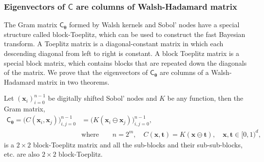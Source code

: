 \documentclass{svjour3}                     %
\newcommand{\bm}[1]{\boldsymbol{#1}}
\newcommand{\vtheta}{{\bm{\theta}}}
\newcommand{\vt}{\bm{t}}
\newcommand{\vx}{\bm{x}}
\newcommand{\mC}{\mathsf{C}}
\newcommand{\mCtheta}{{\mathsf{C}_{\vtheta}}}
\begin{document}
\subsubsection{Eigenvectors of $\mC$ are columns of Walsh-Hadamard matrix}
\label{sec:eigenvector_hadamard}
The Gram matrix $\mCtheta$ formed by Walsh kernels and Sobol' nodes have a special structure called  block-Toeplitz, which can be used to construct the fast Bayesian transform. 
A Toeplitz matrix is a diagonal-constant matrix in which each descending diagonal from left to right is constant. A block Toeplitz matrix is a special block matrix, which contains blocks that are repeated down the diagonals of the matrix.
We prove that the eigenvectors of $\mCtheta$ are columns of a Walsh-Hadamard matrix in two theorems. 

\begin{theorem}
	\label{thrm:block-toeplitz}
	Let $\left(\vx_i\right)_{i=0}^{n-1}$ be digitally shifted Sobol' nodes and $K$ be any function,
	then the Gram matrix,
	\begin{align*}
	\mCtheta = \bigl(C(\vx_i, \vx_j)\bigr)_{i,j=0}^{n-1} &= \bigl(K(\vx_i \ominus \vx_j)\bigr)_{i,j=0}^{n-1},   \\ & \text{where} \quad \quad n=2^m, \quad C(\vx, \vt) = K(\vx \ominus \vt), \quad  \vx, \vt \in [0,1)^d, \qquad
	\end{align*}
	is a $2\times 2$ block-Toeplitz matrix and all the sub-blocks and their sub-sub-blocks, etc. are also $2\times 2$ block-Toeplitz. 
\end{theorem}
\end{document}
